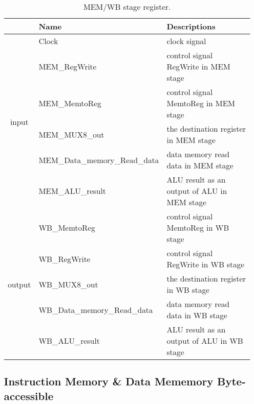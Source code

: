 \documentclass[a4paper]{article}
\begin{document}
\begin{table}[H]
    \centering
    \begin{tabular}{|c|l|l|}
        \hline
        &Name&Descriptions\\
        \hline
        \multirow{6}{*}{input}&Clock&clock signal\\
        \cline{2-3}
        &MEM\_RegWrite&control signal RegWrite in MEM stage\\
        \cline{2-3}
        &MEM\_MemtoReg&control signal MemtoReg in MEM stage\\
        \cline{2-3}
        &MEM\_MUX8\_out&the destination register in MEM stage\\
        \cline{2-3}
        &MEM\_Data\_memory\_Read\_data&data memory read data in MEM stage\\
        \cline{2-3}
        &MEM\_ALU\_result&ALU result as an output of ALU in MEM stage\\
        \hline
        \multirow{5}{*}{output}&WB\_MemtoReg&control signal MemtoReg in WB stage\\
        \cline{2-3}
        &WB\_RegWrite&control signal RegWrite in WB stage\\
        \cline{2-3}
        &WB\_MUX8\_out&the destination register in WB stage\\
        \cline{2-3}
        &WB\_Data\_memory\_Read\_data&data memory read data in WB stage\\
        \cline{2-3}
        &WB\_ALU\_result&ALU result as an output of ALU in WB stage\\
        \hline
    \end{tabular}
    \caption{MEM/WB stage register.}
\end{table}
\subsection{Instruction Memory \& Data Mememory Byte-accessible}
\end{document}
